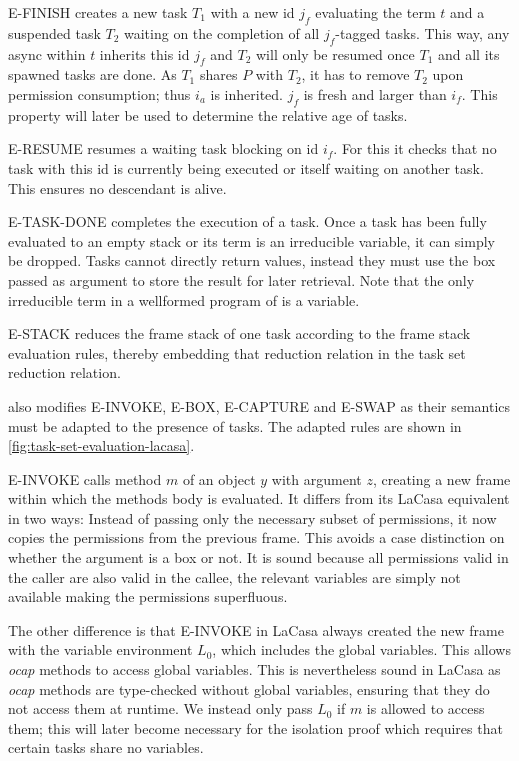 E-FINISH creates a new task $T_1$ with a new id $j_f$ evaluating the term $t$ and a suspended task $T_2$ waiting on the completion of all $j_f$-tagged tasks. This way, any async within $t$ inherits this id $j_f$ and $T_2$ will only be resumed once $T_1$ and all its spawned tasks are done. As $T_1$ shares $P$ with $T_2$, it has to remove $T_2$ upon permission consumption; thus $i_a$ is inherited. $j_f$ is fresh and larger than $i_f$. This property will later be used to determine the relative age of tasks.

E-RESUME resumes a waiting task blocking on id $i_f$. For this it checks that no task with this id is currently being executed or itself waiting on another task. This ensures no descendant is alive.

E-TASK-DONE completes the execution of a task. Once a task has been fully evaluated to an empty stack or its term is an irreducible variable, it can simply be dropped. Tasks cannot directly return values, instead they must use the box passed as argument to store the result for later retrieval. Note that the only irreducible term in a wellformed program of \plc is a variable.

E-STACK reduces the frame stack of one task according to the frame stack evaluation rules, thereby embedding that reduction relation in the task set reduction relation.

\plc also modifies E-INVOKE, E-BOX, E-CAPTURE and E-SWAP as their semantics must be adapted to the presence of tasks. The adapted rules are shown in \cref{fig:task-set-evaluation-lacasa}.

E-INVOKE calls method $m$ of an object $y$ with argument $z$, creating a new frame within which the methods body is evaluated. It differs from its LaCasa equivalent in two ways: Instead of passing only the necessary subset of permissions, it now copies the permissions from the previous frame. This avoids a case distinction on whether the argument is a box or not. It is sound because all permissions valid in the caller are also valid in the callee, the relevant variables are simply not available making the permissions superfluous.

The other difference is that E-INVOKE in LaCasa always created the new frame with the variable environment $L_0$, which includes the global variables. This allows \textit{ocap} methods to access global variables. This is nevertheless sound in LaCasa as \textit{ocap} methods are type-checked without global variables, ensuring that they do not access them at runtime. We instead only pass $L_0$ if $m$ is allowed to access them; this will later become necessary for the isolation proof which requires that certain tasks share no variables.


